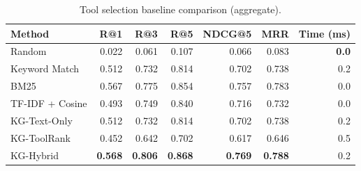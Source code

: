 \begin{table}[t]
\centering
\caption{Tool selection baseline comparison (aggregate).}
\label{tab:baselines-aggregate}
\begin{tabular}{lrrrrrr}
\toprule
Method & R@1 & R@3 & R@5 & NDCG@5 & MRR & Time (ms) \\
\midrule
Random & 0.022 & 0.061 & 0.107 & 0.066 & 0.083 & \textbf{0.0} \\
Keyword Match & 0.512 & 0.732 & 0.814 & 0.702 & 0.738 & 0.2 \\
BM25 & 0.567 & 0.775 & 0.854 & 0.757 & 0.783 & 0.0 \\
TF-IDF + Cosine & 0.493 & 0.749 & 0.840 & 0.716 & 0.732 & 0.0 \\
KG-Text-Only & 0.512 & 0.732 & 0.814 & 0.702 & 0.738 & 0.2 \\
KG-ToolRank & 0.452 & 0.642 & 0.702 & 0.617 & 0.646 & 0.5 \\
KG-Hybrid & \textbf{0.568} & \textbf{0.806} & \textbf{0.868} & \textbf{0.769} & \textbf{0.788} & 0.2 \\
\bottomrule
\end{tabular}
\end{table}